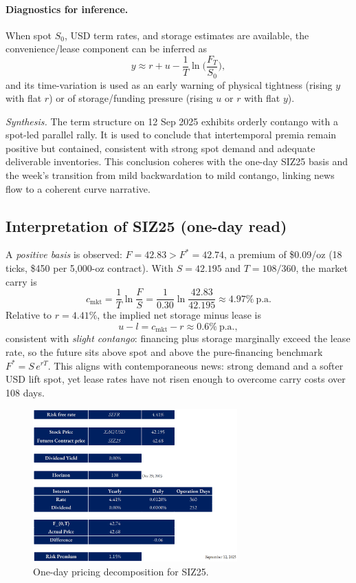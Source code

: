 \documentclass[11pt,a4paper]{article} %
\begin{document}
\paragraph{Diagnostics for inference.}
When spot \(S_0\), USD term rates, and storage estimates are available, the convenience/lease component can be inferred as
\[
y \approx r + u - \frac{1}{T} \ln\!\Big(\frac{F_T}{S_0}\Big),
\]
and its time-variation is used as an early warning of physical tightness (rising \(y\) with flat \(r\)) or of storage/funding pressure (rising \(u\) or \(r\) with flat \(y\)).

\medskip
\noindent\emph{Synthesis.} The term structure on 12 Sep 2025 exhibits orderly contango with a spot-led parallel rally. It is used to conclude that intertemporal premia remain positive but contained, consistent with strong spot demand and adequate deliverable inventories. This conclusion coheres with the one-day SIZ25 basis and the week’s transition from mild backwardation to mild contango, linking news flow to a coherent curve narrative.


\subsection{Interpretation of \texorpdfstring{SIZ25}{SIZ25} (one-day read)}
A \emph{positive basis} is observed: \(F=42.83>F^{*}=42.74\), a premium of \$0.09/oz (18 ticks, \$450 per 5{,}000-oz contract). With \(S=42.195\) and \(T=108/360\), the market carry is
\[
c_{\mathrm{mkt}}=\frac{1}{T}\ln\!\frac{F}{S}
=\frac{1}{0.30}\ln\!\frac{42.83}{42.195}\approx 4.97\%\ \text{p.a.}
\]
Relative to \(r=4.41\%\), the implied net storage minus lease is
\[
u-l=c_{\mathrm{mkt}}-r\approx 0.6\%\ \text{p.a.},
\]
consistent with \emph{slight contango}: financing plus storage marginally exceed the lease rate, so the future sits above spot and above the pure-financing benchmark \(F^{*}=S\,e^{rT}\). This aligns with contemporaneous news: strong demand and a softer USD lift spot, yet lease rates have not risen enough to overcome carry costs over 108 days.

\begin{figure}[h]
\centering
\includegraphics[width=0.7\textwidth]{figures/silver_pricing_one_day.png}
\caption{One-day pricing decomposition for SIZ25.}
\label{fig:silver_one_day}
\end{figure}
\end{document}
